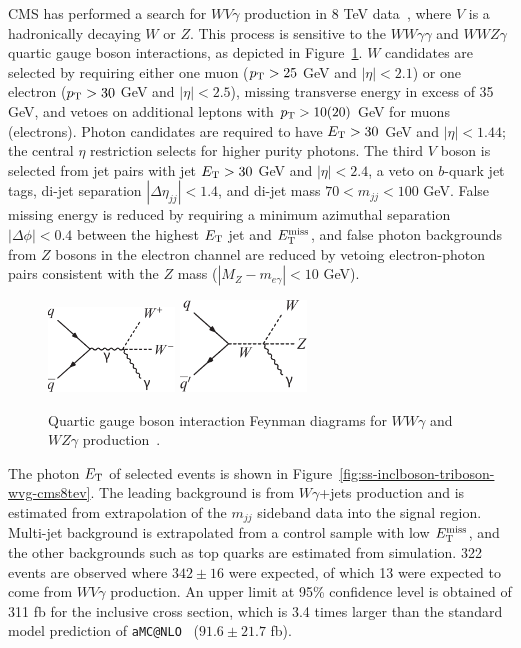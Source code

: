CMS has performed a search for $WV\gamma$ production in 8 TeV
data~\cite{Chatrchyan:2014bza}, where $V$ is a hadronically decaying
$W$ or $Z$.  This process is sensitive to the $WW\gamma\gamma$ and
$WWZ\gamma$ quartic gauge boson interactions, as depicted in
Figure~\ref{fig:ss-inclboson-triboson-wvg-diagrams}.  $W$ candidates are
selected by requiring either one muon ($p_{\mathrm{T}} > 25$ GeV and
$|\eta|<2.1$) or one electron ($p_{\mathrm{T}} > 30$ GeV and $|\eta| < 2.5$),
missing transverse energy in excess of 35 GeV, and vetoes on
additional leptons with $p_{\mathrm{T}} > 10 (20)$ GeV for muons (electrons).
Photon candidates are required to have $E_{\mathrm{T}} > 30$ GeV and $|\eta| <
1.44$; the central $\eta$ restriction selects for higher purity
photons.  The third $V$ boson is selected from jet pairs with jet $E_{\mathrm{T}}
> 30$ GeV and $|\eta| < 2.4$, a veto on $b$-quark jet tags, di-jet
separation $|\Delta\eta_{jj}| < 1.4$, and di-jet mass $70 < m_{jj} <
100$ GeV.  False missing energy is reduced by requiring a minimum
azimuthal separation $|\Delta\phi| < 0.4$ between the highest $E_{\mathrm{T}}$
jet and $E_{\mathrm{T}}^{\mathrm{miss}}$, and false photon backgrounds from $Z$ bosons in the
electron channel are reduced by vetoing electron-photon pairs
consistent with the $Z$ mass ($|M_Z-m_{e\gamma}| < 10$ GeV).

\begin{figure}[p]
    \centering
    \includegraphics[width=0.3\textwidth]{figures/ss-inclboson-triboson-wvg-diagram1.pdf}
    \includegraphics[width=0.3\textwidth]{figures/ss-inclboson-triboson-wvg-diagram2.pdf}
    \caption{Quartic gauge boson interaction Feynman diagrams for $WW\gamma$ and $WZ\gamma$ production~\cite{Chatrchyan:2014bza}.}
    \label{fig:ss-inclboson-triboson-wvg-diagrams}
\end{figure}


The photon $E_{\mathrm{T}}$ of selected events is shown in
Figure~\ref{fig:ss-inclboson-triboson-wvg-cms8tev}.  The leading
background is from $W\gamma$+jets production and is estimated from
extrapolation of the $m_{jj}$ sideband data into the signal region.
Multi-jet background is extrapolated from a control sample with low
$E_{\mathrm{T}}^{\mathrm{miss}}$, and the other backgrounds such as top quarks are estimated
from simulation.  322 events are observed where $342\pm 16$ were
expected, of which 13 were expected to come from $WV\gamma$
production.  An upper limit at 95\% confidence level is obtained of
311 fb for the inclusive cross section, which is 3.4 times larger than
the standard model prediction of \texttt{aMC@NLO}~\cite{Alwall:2014hca} ($91.6 \pm 21.7$ fb).

